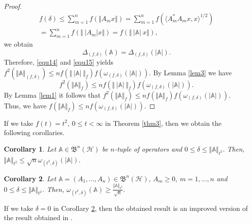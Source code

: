 \documentclass[12pt]{article}
\newtheorem{corollary}{Corollary}
\begin{document}
\begin{proof}
\begin{multline*}
f(\delta)\leq \sum\limits_{m=1}^n f\left( \Vert A_{m}x \Vert \right) = \sum\limits_{m=1}^n f \left( \langle A_{m}^*A_{m}x,x \rangle^{1/2} \right) \\
= \sum\limits_{m=1}^n f \left( \Vert \ \vert A_{m} \vert x \Vert  \right) = f \left( \Vert \ \vert \mathbb{A} \vert \ x \Vert  \right) ,
\end{multline*}
we obtain
\begin{equation}
\label{equ15}
\Delta_{(f,\delta )}(\mathbb{A}) = \Delta_{(f,\delta)}(\vert \mathbb{A} \vert).
\end{equation}
Therefore, \eqref{equ14} and \eqref{equ15} yields
\(
f^{2}\left( \Vert \mathbb{A} \Vert_{(f,\delta )} \right)
\leq n f \left( \Vert \ \vert \mathbb{A}  \vert \ \Vert_{f}   \right)
f\left( \omega_{(f,\delta )}( \vert \mathbb{A} \vert )\right)
.
\)
By Lemma \ref{lem3} we have
\[
f^{2}\left( \Vert \mathbb{A} \Vert_{f} \right)
\leq n f \left( \Vert \ \vert \mathbb{A} \vert \ \Vert_{f}   \right)
f\left( \omega_{(f,\delta )}( \vert \mathbb{A} \vert )\right)
.
\]
By Lemma \ref{lem1} it follows that
\(
f^{2}\left( \Vert \mathbb{A} \Vert_{f} \right)
\leq n f \left( \Vert \mathbb{A} \Vert_{f}  \right)
f\left( \omega_{(f,\delta )}( \vert \mathbb{A} \vert )\right)
.
\)
Thus, we have
\(
f\left( \Vert \mathbb{A} \Vert_{f} \right)
\leq n
f\left( \omega_{(f,\delta )}( \vert \mathbb{A} \vert )\right)
.
\)
\end{proof}

If we take $ f(t)=t^{2}, \ 0\leq t< \infty  $ in Theorem \ref{thm3}, then we obtain the following corollaries.
\begin{corollary}
\label{cor3}
Let $ \mathbb{A} \in \mathfrak{B}^{n}(\mathcal{H}) $ be $n$-tuple of operators and
$0 \leq \delta \leq \Vert \mathbb{A}\Vert_{t^{2}}.$  Then,
\(
\Vert \mathbb{A} \Vert_{t^{2}} \leq \sqrt{n} \omega_{(t^{2},\delta)}(\vert \mathbb{A} \vert ).
\)
\end{corollary}

\begin{corollary}
\label{cor4}
Let $\mathbb{A} = (A_1,\dots,A_n) \in \mathfrak{B}^n(\mathcal{H})$, $ A_{m}\geq 0, \ m=1,\ldots, n $ and $ 0\leq \delta \leq \Vert \mathbb{A} \Vert_{t^{2}}$. Then,
\(
\omega_{(t^{2},\delta)}(\mathbb{A})\geq \frac{\Vert \mathbb{A} \Vert_{t^{2}}}{\sqrt{n}}.
\)
\end{corollary}

If we take $ \delta =0 $ in  Corollary \ref{cor4}, then the obtained result is an improved version of the result obtained in \cite{Drnovsek2014}.
\end{document}
